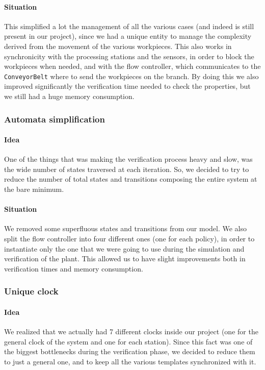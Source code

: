\documentclass[a4paper,twoside]{article}
\begin{document}
    \paragraph{Situation} This simplified a lot the management of all the various cases (and indeed is still present in our project), since we had a unique entity to manage the complexity derived from the movement of the various workpieces. This also works in synchronicity with the processing stations and the sensors, in order to block the workpieces when needed, and with the flow controller, which communicates to the \texttt{ConveyorBelt} where to send the workpieces on the branch. By doing this we also improved significantly the verification time needed to check the properties, but we still had a huge memory consumption.

    \subsubsection{Automata simplification}

    \paragraph{Idea} One of the things that was making the verification process heavy and slow, was the wide number of states traversed at each iteration. So, we decided to try to reduce the number of total states and transitions composing the entire system at the bare minimum.

    \paragraph{Situation} We removed some superfluous states and transitions from our model. We also split the flow controller into four different ones (one for each policy), in order to instantiate only the one that we were going to use during the simulation and verification of the plant. This allowed us to have slight improvements both in verification times and memory consumption.

    \subsubsection{Unique clock}

    \paragraph{Idea} We realized that we actually had 7 different clocks inside our project (one for the general clock of the system and one for each station). Since this fact was one of the biggest bottlenecks during the verification phase, we decided to reduce them to just a general one, and to keep all the various templates synchronized with it.
\end{document}
